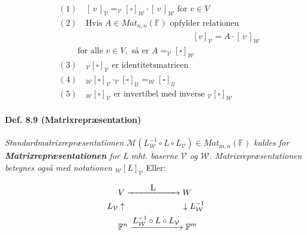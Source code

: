 \documentclass[paper=a4, fontsize=11pt]{scrartcl} %
\begin{document}
	
	\begin{align*}
		&(1) \quad [\,v\,]_{\mathcal{V}} = _{\mathcal{V}}[{{\scriptstyle\square}}]_{\mathcal{W}} \cdot [\,v\,]_{\mathcal{W}} \text{ for } v \in V\\
		&(2) \quad \text{Hvis } A \in Mat_{n,n}(\mathbb{F}) \text{ opfylder relationen}\\
		&\qquad \qquad\qquad\qquad\qquad\qquad\qquad\qquad[v]_{\mathcal{V}} = A \cdot [\,v\,]_{\mathcal{W}}\\
		&\qquad \; \text{for alle } v \in V, \text{ så er } A = _{\mathcal{V}}[{\scriptstyle\square}]_{\mathcal{W}}\\
		&(3) \quad _{\mathcal{V}}[{\scriptstyle\square}]_{\mathcal{V}} \text{ er identitetsmatricen} \\
		&(4) \quad _{\mathcal{W}}[{\scriptstyle\square}]_{\mathcal{V}} \cdot _{\mathcal{V}}[{\scriptstyle\square}]_{\mathcal{U}} = _{\mathcal{W}}[{\scriptstyle\square}]_{\mathcal{U}}\\
		&(5) \quad _{\mathcal{W}}[{\scriptstyle\square}]_{\mathcal{V}} \text{ er invertibel med inverse } _{\mathcal{V}}[{\scriptstyle\square}]_{\mathcal{W}}
	\end{align*}
	
	
	
	
	\paragraph{Def. 8.9 (Matrixrepræsentation)}
	
	\textit{Standardmatrixrepræsentationen $\mathcal{M}(L_{\mathcal{W}}^{-1} \circ L \circ L_{\mathcal{V}}) \in Mat_{m,n}(\mathbb{F})$ kaldes for \textbf{Matrixrepræsentationen} for L mht. baserne $\mathcal{V}$ og $\mathcal{W}$. Matrixrepræsentationen betegnes også med notationen $_{\mathcal{W}}[L]_{\mathcal{V}}$}
	Eller:
	
	\begin{align*}
		&V \xrightarrow{\makebox[2cm]{L}} W\\
		L_{\mathcal{V}} & \uparrow \qquad \qquad \qquad \quad \downarrow L_{\mathcal{W}}^{-1}\\
		&\mathbb{F}^n \xrightarrow{\makebox[2cm]{$L_{\mathcal{W}}^{-1} \circ L \circ L_{\mathcal{V}}$}} \mathbb{F}^m
	\end{align*}
	
\end{document}

